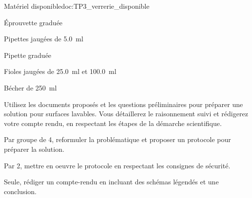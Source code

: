 \begin{doc}{Matériel disponible}{doc:TP3_verrerie_disponible}
  \begin{listePoints}[2]
    \item Éprouvette graduée
    \item Pipettes jaugées de \qty{5,0}{\ml}
    \item Pipette graduée
    \item Fioles jaugées de \qty{25,0}{\ml} et \qty{100,0}{\ml}
    \item Bécher de \qty{250}{\ml}
  \end{listePoints}
\end{doc}

\vspace*{-8pt}






\mesure
Utilisez les documents proposés et les questions préliminaires pour préparer une solution pour surfaces lavables.
Vous détaillerez le raisonnement suivi et rédigerez votre compte rendu, en respectant les étapes de la démarche scientifique.
\begin{protocole}
  \item Par groupe de 4, reformuler la problématique et proposer un protocole pour préparer la solution.
  \item Par 2, mettre en oeuvre le protocole en respectant les consignes de sécurité.
  \item Seule, rédiger un compte-rendu en incluant des schémas légendés et une conclusion.
\end{protocole}
